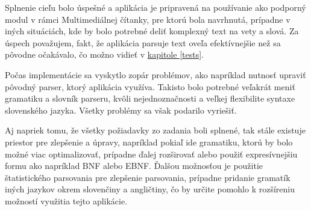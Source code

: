 \documentclass[12pt,a4paper]{report}
\theoremstyle{definition}
\theoremstyle{remark}
\begin{document}
Splnenie cieľu bolo úspešné a aplikácia je pripravená na používanie ako podporný modul v rámci Multimediálnej čítanky, pre ktorú bola navrhnutá, prípadne v iných situáciách, kde by bolo potrebné deliť komplexný text na vety a slová. Za  úspech považujem, fakt, že aplikácia parsuje text oveľa efektívnejšie než sa pôvodne očakávalo, čo možno vidieť v \hyperref[tests]{kapitole \ref{tests}}.



Počas implementácie sa vyskytlo zopár problémov, ako napríklad nutnosť upraviť pôvodný parser, ktorý aplikácia využíva. Takisto bolo potrebné veľakrát meniť gramatiku a slovník parseru, kvôli nejednoznačnosti a veľkej flexibilite syntaxe slovenského jazyka. Všetky problémy sa však podarilo vyriešiť.

Aj napriek tomu, že všetky požiadavky zo zadania boli splnené, tak stále existuje priestor pre zlepšenie a úpravy, napríklad pokiaľ ide gramatiku, ktorú by bolo možné viac optimalizovať, prípadne ďalej rozširovať alebo použiť expresívnejšiu formu ako napríklad BNF alebo EBNF. Ďalšou možnosťou je použitie štatistického parsovania pre zlepšenie parsovania, prípadne pridanie gramatík iných jazykov okrem slovenčiny a angličtiny, čo by určite pomohlo k rozšíreniu možností využitia tejto aplikácie. 
\end{document}
